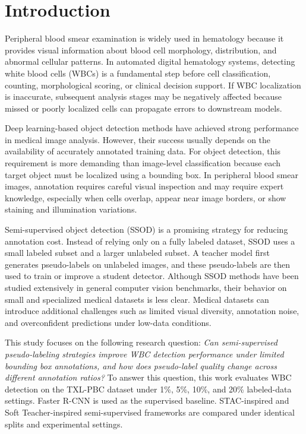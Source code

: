 \documentclass[conference,a4paper]{IEEEtran}
\begin{document}
\section{Introduction}
Peripheral blood smear examination is widely used in hematology because it provides visual information about blood cell morphology, distribution, and abnormal cellular patterns. In automated digital hematology systems, detecting white blood cells (WBCs) is a fundamental step before cell classification, counting, morphological scoring, or clinical decision support. If WBC localization is inaccurate, subsequent analysis stages may be negatively affected because missed or poorly localized cells can propagate errors to downstream models.

Deep learning-based object detection methods have achieved strong performance in medical image analysis. However, their success usually depends on the availability of accurately annotated training data. For object detection, this requirement is more demanding than image-level classification because each target object must be localized using a bounding box. In peripheral blood smear images, annotation requires careful visual inspection and may require expert knowledge, especially when cells overlap, appear near image borders, or show staining and illumination variations.

Semi-supervised object detection (SSOD) is a promising strategy for reducing annotation cost. Instead of relying only on a fully labeled dataset, SSOD uses a small labeled subset and a larger unlabeled subset. A teacher model first generates pseudo-labels on unlabeled images, and these pseudo-labels are then used to train or improve a student detector. Although SSOD methods have been studied extensively in general computer vision benchmarks, their behavior on small and specialized medical datasets is less clear. Medical datasets can introduce additional challenges such as limited visual diversity, annotation noise, and overconfident predictions under low-data conditions.

This study focuses on the following research question: \textit{Can semi-supervised pseudo-labeling strategies improve WBC detection performance under limited bounding box annotations, and how does pseudo-label quality change across different annotation ratios?} To answer this question, this work evaluates WBC detection on the TXL-PBC dataset under 1\%, 5\%, 10\%, and 20\% labeled-data settings. Faster R-CNN is used as the supervised baseline. STAC-inspired and Soft Teacher-inspired semi-supervised frameworks are compared under identical splits and experimental settings.
\end{document}
